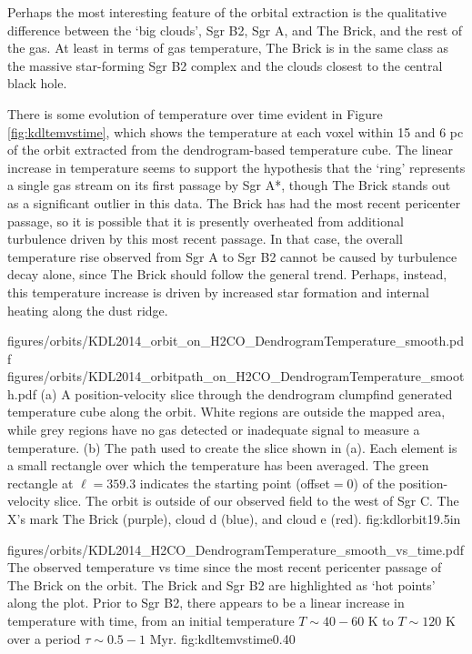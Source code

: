 Perhaps the most interesting feature of the orbital extraction is the qualitative
difference between the `big clouds', Sgr B2, Sgr A, and The Brick, and the rest
of the gas.  At least in terms of gas temperature, The Brick is in the same class
as the massive star-forming Sgr B2 complex and the clouds closest to the central
black hole.

There is some evolution of temperature over time evident in Figure
\ref{fig:kdltemvstime}, which shows the temperature at each voxel within 15
\kms and 6 pc of the \citet{Kruijssen2014d} orbit extracted from the
dendrogram-based temperature cube.  The linear increase in temperature seems to
support the \citet{Kruijssen2014d} hypothesis that the `ring' represents a
single gas stream on its first passage by Sgr A*, though The Brick stands out
as a significant outlier in this data.  The Brick has had the most recent
pericenter passage, so it is possible that it is presently overheated from
additional turbulence driven by this most recent passage.  In that case, the
overall temperature rise observed from Sgr A to Sgr B2 cannot be caused by
turbulence decay alone, since The Brick should follow the general trend.
Perhaps, instead, this temperature increase is driven by increased star
formation and internal heating along the dust ridge.

\RotFigureTwoAA
{figures/orbits/KDL2014_orbit_on_H2CO_DendrogramTemperature_smooth.pdf}
{figures/orbits/KDL2014_orbitpath_on_H2CO_DendrogramTemperature_smooth.pdf}
{(a) A position-velocity slice through the dendrogram clumpfind generated
temperature cube along the \citet{Kruijssen2014d} orbit.  White regions are
outside the mapped area, while grey regions have no gas detected or inadequate
signal to measure a temperature.
(b) The path used to create the slice shown in (a).  Each element is a small
rectangle over which the temperature has been averaged.  The green rectangle at
$\ell=359.3$ indicates the starting point (offset$=0$) of the position-velocity
slice.  The orbit is outside of our observed field to the west of Sgr C.  
The X's mark The Brick (purple), cloud d (blue), and cloud e (red).
}
{fig:kdlorbit}{1}{9.5in}

\Figure
{figures/orbits/KDL2014_H2CO_DendrogramTemperature_smooth_vs_time.pdf}
{The observed temperature vs time since the most recent pericenter passage of
The Brick on the \citet{Kruijssen2014d} orbit.  The Brick and Sgr B2 are
highlighted as `hot points' along the plot.  Prior to Sgr B2, there appears to
be a linear increase in temperature with time, from an initial temperature
$T\sim40-60$ K to $T\sim120$ K over a period $\tau\sim0.5-1$ Myr.}
{fig:kdltemvstime}{0.4}{0}

